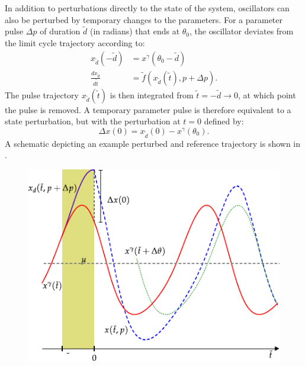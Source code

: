 In addition to perturbations directly to the state of the system, oscillators can also be perturbed by temporary changes to the parameters.
For a parameter pulse $\Delta p$ of duration $\tilde{d}$ (in radians) that ends at $\theta_0$, the oscillator deviates from the limit cycle trajectory according to:
\begin{align}
  x_{\tilde{d}}(-\tilde{d}) &= x^\gamma(\theta_0 - \tilde{d}) \\
  \frac{dx_{\tilde{d}}}{d\tilde{t}} &= \tilde{f}(x_{\tilde{d}}(\tilde{t}), p + \Delta p) \label{eq:ode_pert}.
\end{align}
The pulse trajectory $x_{\tilde{d}}(\tilde{t})$ is then integrated from $\tilde{t} = -\tilde{d} \to 0$, at which point the pulse is removed.
A temporary parameter pulse is therefore equivalent to a state perturbation, but with the perturbation at $t = 0$ defined by:
\begin{equation}
  \Delta x(0) = x_{\tilde{d}}(0) - x^\gamma(\theta_0).
\end{equation}
A schematic depicting an example perturbed and reference trajectory is shown in .

\begin{figure}[tbp]
  \begin{center}
    \includegraphics[width=.75\textwidth]{chap5/figures/figure_1_schem.pdf}
  \end{center}
  \label{fig:51schem}
\end{figure}

